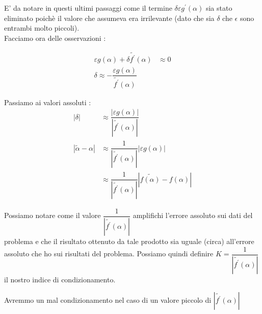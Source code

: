 \documentclass[12pt, a4paper]{book}
\theoremstyle{definition}
\begin{document}
\begin{flushleft}
 E' da notare in questi ultimi passaggi come il termine $\delta \varepsilon g^{'}(\alpha)$ sia stato eliminato poichè il valore che assumeva era irrilevante (dato che sia $\delta$ che $\epsilon$ sono entrambi molto piccoli). \\
Facciamo ora delle osservazioni :

\begin{equation}
	\begin{split}
		 \varepsilon g(\alpha) + \delta \tilde{f^{'}}(\alpha) & \approx 0 \\
		 \delta \approx - \dfrac{\varepsilon g(\alpha)}{ \tilde{f^{'}}(\alpha)}
	\end{split}
\end{equation}


Passiamo ai valori assoluti :
\begin{equation}
	\begin{split}
		 | \delta | & \approx   \dfrac{| \varepsilon g(\alpha) |}{ | \tilde{f^{'}}(\alpha)| } \\
		 | \tilde{\alpha} - \alpha | & \approx \dfrac{1}{| \tilde{f^{'}}(\alpha)|} |\varepsilon g(\alpha)| \\
		 & \approx \dfrac{1}{| \tilde{f^{'}}(\alpha)|} | \tilde{f(\alpha)} - f(\alpha) |
	\end{split}
\end{equation}

Possiamo notare come il valore $\dfrac{1}{| \tilde{f^{'}}(\alpha)|}$ amplifichi l'errore assoluto sui dati del problema e che il risultato ottenuto da tale prodotto sia uguale (circa) all'errore assoluto che ho sui risultati del problema. Possiamo quindi definire $K = \dfrac{1}{| \tilde{f^{'}}(\alpha)|}$ il nostro indice di condizionamento.\\
\vspace{1em}

Avremmo un mal condizionamento nel caso di un valore piccolo di $|\tilde{f^{'}}(\alpha)|$
\end{flushleft}
\end{document}
